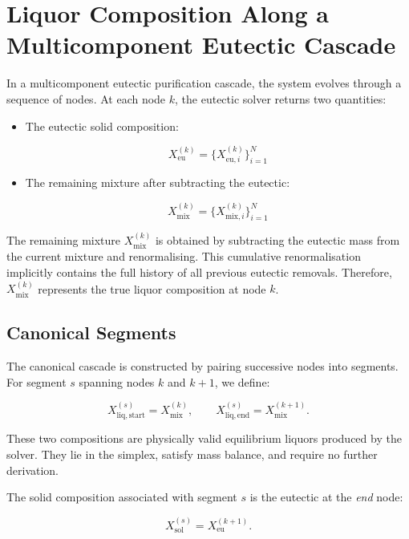 \section{Liquor Composition Along a Multicomponent Eutectic Cascade}

In a multicomponent eutectic purification cascade, the system evolves through a
sequence of nodes. At each node $k$, the eutectic solver returns two quantities:

\begin{itemize}
    \item The eutectic solid composition:
    

\[
        X^{(k)}_{\mathrm{eu}} = \{ X^{(k)}_{\mathrm{eu},i} \}_{i=1}^N
    \]


    \item The remaining mixture after subtracting the eutectic:
    

\[
        X^{(k)}_{\mathrm{mix}} = \{ X^{(k)}_{\mathrm{mix},i} \}_{i=1}^N
    \]


\end{itemize}

The remaining mixture $X^{(k)}_{\mathrm{mix}}$ is obtained by subtracting the
eutectic mass from the current mixture and renormalising. This cumulative
renormalisation implicitly contains the full history of all previous eutectic
removals. Therefore, $X^{(k)}_{\mathrm{mix}}$ represents the true liquor
composition at node $k$.

\subsection{Canonical Segments}

The canonical cascade is constructed by pairing successive nodes into segments.
For segment $s$ spanning nodes $k$ and $k+1$, we define:



\[
    X^{(s)}_{\mathrm{liq,start}} = X^{(k)}_{\mathrm{mix}}, \qquad
    X^{(s)}_{\mathrm{liq,end}}   = X^{(k+1)}_{\mathrm{mix}}.
\]



These two compositions are physically valid equilibrium liquors produced by the
solver. They lie in the simplex, satisfy mass balance, and require no further
derivation.

The solid composition associated with segment $s$ is the eutectic at the
\emph{end} node:



\[
    X^{(s)}_{\mathrm{sol}} = X^{(k+1)}_{\mathrm{eu}}.
\]




